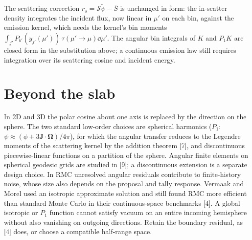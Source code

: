 \documentclass[11pt]{article}
\newcommand{\tpsi}{\tilde\psi}
\newcommand{\Sbar}{\bar S}
\begin{document}
The scattering correction $r_s=\mathcal S\tpsi-\Sbar$ is unchanged in form: the
in-scatter density integrates the incident flux, now linear in $\mu'$ on each bin,
against the emission kernel, which needs the kernel's bin moments
$\int_{j'}P_{b'}(y_{j'}(\mu'))\,\tau(\mu'\to\mu)\dd\mu'$.
The angular bin integrals of $K$ and $P_1K$ are closed form in the substitution
above; a continuous emission law still requires integration over its scattering
cosine and incident energy.

\section{Beyond the slab}

In 2D and 3D the polar cosine about one axis is replaced by the direction on the sphere.
The two standard low-order choices are spherical harmonics ($P_1$: $\psi\approx(\phi+3
\mathbf J\cdot\boldsymbol\Omega)/4\pi$), for which the angular transfer reduces to the
Legendre moments of the scattering kernel by the addition theorem [7], and discontinuous
piecewise-linear functions on a partition of the sphere. Angular finite elements
on spherical geodesic grids are studied in [9]; a discontinuous extension is a
separate design choice.
In RMC unresolved angular residuals contribute to finite-history noise, whose
size also depends on the proposal and tally response. Vermaak and Morel used an
isotropic approximate solution and
still found RMC more efficient than standard Monte Carlo in their continuous-space
benchmarks [4]. A global isotropic or $P_1$ function cannot satisfy vacuum on an
entire incoming hemisphere without also vanishing on outgoing directions. Retain
the boundary residual, as [4] does, or choose a compatible half-range space.
\end{document}
